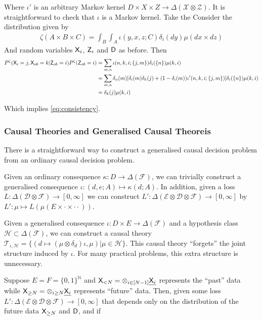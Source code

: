 Where $\iota'$ is an arbitrary Markov kernel $D\times X\times Z\to \Delta(\mathcal{X}\otimes\mathcal{Z})$. It is straightforward to check that $\iota$ is a Markov kernel. Take the Consider the distribution given by
\begin{align}
    \zeta (A\times B\times C) =  \int_B \int_A  \iota(y,x,z; C) \delta_i(dy) \mu(dx\times dz)
\end{align}
And random variables $\mathsf{X}_i$, $\mathsf{Z}_i$ and $\mathsf{D}$ as before. Then
\begin{align}
    P^\zeta(\mathsf{X}_i=j,\mathsf{X}_{ob}=k|\mathsf{Z}_{ob}=i)P^\zeta(\mathsf{Z}_{ob}=i) &= \sum_{m,n} \iota(n,k,i;\{j,m\}) \delta_i(\{n\}) \mu(k,i)\\
     &= \sum_{m,n} \delta_n(m)[\delta_i(m) \delta_k(j) + (1-\delta_i(m))\iota'(n,k,i;\{j,m\})]\delta_i(\{n\}) \mu(k,i)\\
     &= \delta_k(j) \mu(k,i)
\end{align}

Which implies \ref{eq:consistency}.

\subsubsection{Causal Theories and Generalised Causal Theoreis}

There is a straightforward way to construct a generalised causal decision problem from an ordinary causal decision problem. 

Given an ordinary consequence $\kappa:D\to \Delta(\mathcal{F})$, we can trivially construct a generalised consequence $\iota:(d,e;A)\mapsto \kappa(d;A)$. In addition, given a loss $L:\Delta(\mathcal{D}\otimes\mathcal{F})\to[0,\infty]$ we can construct $L':\Delta(\mathcal{E}\otimes \mathcal{D}\otimes\mathcal{F})\to[0,\infty]$ by $L':\mu\mapsto L(\mu(E\times \cdot \times \cdot \cdot))$.

Given a generalised consequence $\iota:D\times E\to \Delta(\mathcal{F})$ and a hypothesis class $\mathscr{H}\subset\Delta(\mathcal{F})$, we can construct a causal theory $\mathscr{T}_{\iota,\mathscr{H}} = \{(d\mapsto (\mu\otimes \delta_d)\iota,\mu)|\mu\in \mathscr{H}\}$. This causal theory ``forgets'' the joint structure induced by $\iota$. For many practical problems, this extra structure is unnecessary.

Suppose $E=F=\{0,1\}^\mathbb{N}$ and $\mathsf{X}_{<N}=\otimes_{i\in [N-1]} \underline{\mathsf{X}_i}$ represents the ``past'' data while $\mathsf{X}_{\geq N}=\otimes_{i\geq N} \underline{\mathsf{X}_i}$ represents ``future'' data. Then, given some loss $L':\Delta(\mathcal{E}\otimes \mathcal{D}\otimes\mathcal{F})\to[0,\infty]$ that depends only on the distribution of the future data $\mathsf{X}_{\geq N}$ and $\mathsf{D}$, and if 

